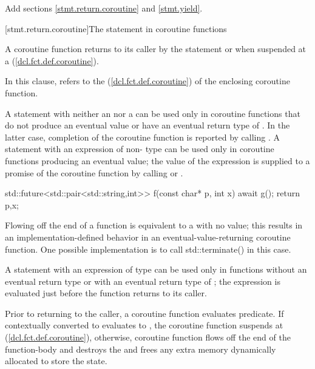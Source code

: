 Add sections \ref{stmt.return.coroutine} and \ref{stmt.yield}.

[stmt.return.coroutine]{The  statement in coroutine functions}%

\pnum
A coroutine function returns to its caller by the  statement
or when suspended at a  (\ref{dcl.fct.def.coroutine}).

\pnum
  In this clause,  refers to the   
  (\ref{dcl.fct.def.coroutine})
  of the enclosing coroutine function.
  
\pnum
A  statement
with neither an  nor a 
can be used only in coroutine functions
that do not produce an eventual value or have an eventual return type of . In the latter case, completion of the coroutine function
is reported by calling .
A  statement with an expression of non- type can be used only
in coroutine functions producing an eventual value; the value of the expression is supplied to a promise of the coroutine function by calling 
 or
.

\enterexample

\begin{codeblock}
  std::future<std::pair<std::string,int>> f(const char* p, int x) {
    await g();
    return {p,x};
  }
\end{codeblock}
\exitexample

Flowing off the end of a function is equivalent to a  with
no value; 
this results in an implementation-defined behavior in an eventual-value-returning coroutine function.
\enternote
One possible implementation is to call std::terminate() in this case.
\exitnote

\pnum
A  statement with an expression of type 
can be used only in functions without an eventual return type 
or with an eventual return type of ; the expression is evaluated just before the function
returns to its caller.

\pnum
Prior to returning to the caller, a coroutine function evaluates
 predicate. If  contextually converted to  evaluates to
, the coroutine function suspends at  (\ref{dcl.fct.def.coroutine}),
otherwise, coroutine function flows off the end of the function-body and destroys the  and frees any extra memory dynamically allocated to store the state.

